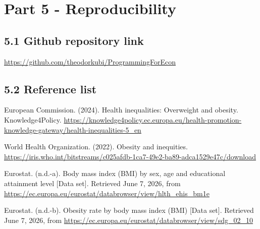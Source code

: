 \documentclass[
]{article}
\begin{document}
\section{Part 5 - Reproducibility}\label{part-5---reproducibility}

\subsection{5.1 Github repository link}\label{github-repository-link}

\url{https://github.com/theodorkubi/ProgrammingForEcon}

\subsection{5.2 Reference list}\label{reference-list}

European Commission. (2024). Health inequalities: Overweight and
obesity. Knowledge4Policy.
\url{https://knowledge4policy.ec.europa.eu/health-promotion-knowledge-gateway/health-inequalities-5_en}

World Health Organization. (2022). Obesity and inequities.
\url{https://iris.who.int/bitstreams/c025afdb-1ca7-49e2-ba89-adca1529e47c/download}

Eurostat. (n.d.-a). Body mass index (BMI) by sex, age and educational
attainment level {[}Data set{]}. Retrieved June 7, 2026, from
\url{https://ec.europa.eu/eurostat/databrowser/view/hlth_ehis_bm1e}

Eurostat. (n.d.-b). Obesity rate by body mass index (BMI) {[}Data
set{]}. Retrieved June 7, 2026, from
\url{https://ec.europa.eu/eurostat/databrowser/view/sdg_02_10}
\end{document}
